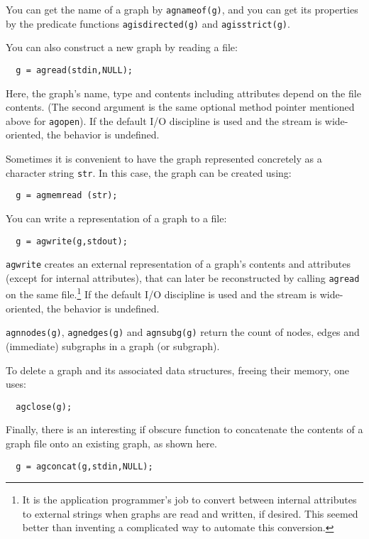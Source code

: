 \documentclass[11pt,letterpaper]{article}
\begin{document}
You can get the name of a graph by \verb"agnameof(g)", and
you can get its properties by the predicate functions
{\tt agisdirected(g)} and {\tt agisstrict(g)}.

You can also construct a new graph by reading a file:
\begin{verbatim}
  g = agread(stdin,NULL);
\end{verbatim}

Here, the graph's name, type and contents including attributes depend
on the file contents.  (The second argument is the same optional method
pointer mentioned above for \verb"agopen"). If the default I/O discipline
is used and the stream is wide-oriented, the behavior is undefined.

Sometimes it is convenient to have the graph represented concretely as a 
character string \verb"str".
In this case, the graph can be created using:
\begin{verbatim}
  g = agmemread (str);
\end{verbatim}

You can write a representation of a graph to a file:

\begin{verbatim}
  g = agwrite(g,stdout);
\end{verbatim}

\verb"agwrite" creates an external representation of a graph's
contents and attributes (except for internal attributes),
that can later be reconstructed by calling \verb"agread"
on the same file.\footnote{It is the application programmer's job to
convert between internal attributes to external strings
when graphs are read and written, if desired.
This seemed better than inventing a complicated way
to automate this conversion.} If the default I/O discipline is used
and the stream is wide-oriented, the behavior is undefined.

\verb"agnnodes(g)", \verb"agnedges(g)" and \verb"agnsubg(g)" return the count of nodes,
edges and (immediate) subgraphs in a graph (or subgraph).

To delete a graph and its associated data structures,
freeing their memory, one uses:
\begin{verbatim}
  agclose(g);
\end{verbatim}

Finally, there is an interesting if obscure function to concatenate
the contents of a graph file onto an existing graph, as shown here.
\begin{verbatim}
  g = agconcat(g,stdin,NULL);
\end{verbatim}
\end{document}
